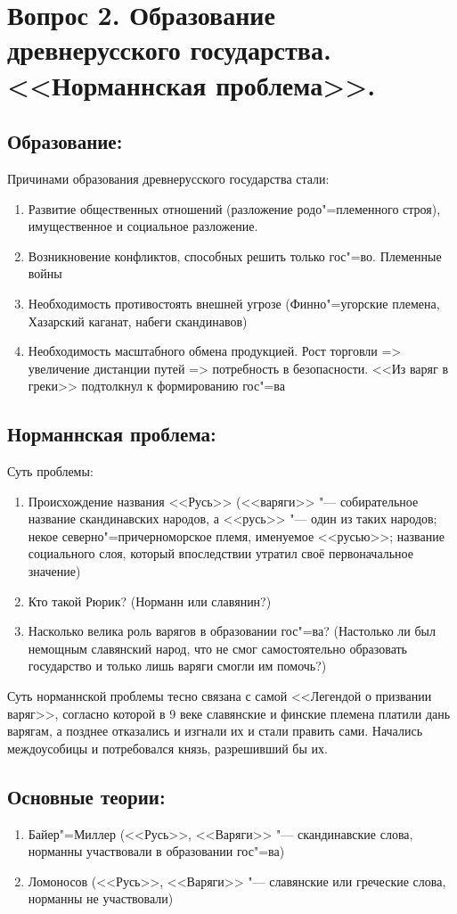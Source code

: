 \section{Вопрос 2. Образование древнерусского государства. <<Норманнская проблема>>.}

\subsection{Образование:}

Причинами образования древнерусского государства стали:

\begin{enumerate}
    \item{Развитие общественных отношений (разложение родо"=племенного строя), имущественное и социальное разложение.}
    \item{Возникновение конфликтов, способных решить только гос"=во. Племенные войны}
    \item{Необходимость противостоять внешней угрозе (Финно"=угорские племена, Хазарский каганат, набеги скандинавов)}
    \item{Необходимость масштабного обмена продукцией. Рост торговли => увеличение дистанции путей => потребность в безопасности. <<Из варяг в греки>>  подтолкнул к формированию гос"=ва}
\end{enumerate}

\subsection{Норманнская проблема:}

Суть проблемы:

\begin{enumerate}
    \item{Происхождение названия <<Русь>> (<<варяги>> "--- собирательное название скандинавских народов, а <<русь>> "--- один из таких народов; некое северно"=причерноморское племя, именуемое <<русью>>; название социального слоя, который впоследствии утратил своё первоначальное значение)}
    \item{Кто такой Рюрик? (Норманн или славянин?)}
    \item{Насколько велика роль варягов в образовании гос"=ва? (Настолько ли был немощным славянский народ, что не смог самостоятельно образовать государство и только лишь варяги смогли им помочь?)}
\end{enumerate}

Суть норманнской проблемы тесно связана с самой <<Легендой о призвании варяг>>, согласно которой в 9 веке славянские и финские племена платили дань варягам, а позднее отказались и изгнали их и стали править сами. Начались междоусобицы и потребовался князь, разрешивший бы их.

\subsection{Основные теории:}
\begin{enumerate}
    \item{Байер"=Миллер (<<Русь>>, <<Варяги>> "--- скандинавские слова, норманны участвовали в образовании гос"=ва)}
    \item{Ломоносов (<<Русь>>, <<Варяги>> "--- славянские или греческие слова, норманны не участвовали)}
\end{enumerate}
